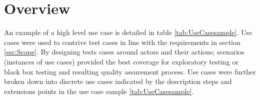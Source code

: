 \vspace{-2mm}
\section{Overview}
		
	\normalsize
	{
		An example of a high level use case is detailed in table \ref{tab:UseCasesample}.  Use cases
		were used to contrive test cases in line with the requirements in section \ref{sec:Scope}.
		By designing tests cases around actors and their actions; scenarios (instances of use cases)
		provided the best coverage for exploratory testing or black box testing and resulting quality assurement process.
		\newline
		\newline
		Use cases were further broken down into discrete use cases indicated by the description steps and extensions points
		in the use case sample \ref{tab:UseCasesample}.
		\newline
	}
	
